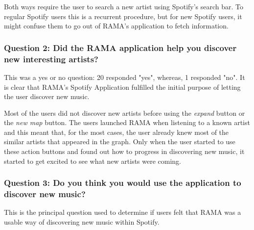       Both ways require the user to search a new artist using Spotify's search bar.
      To regular Spotify users this is a recurrent procedure, but for new Spotify users, it might confuse them to go out of RAMA's application to fetch information.
    
    \subsubsection{Question 2: Did the RAMA application help you discover new interesting artists?}
    \label{ssub:question_2}

      This was a yes or no question: 20 responded "yes", whereas, 1 responded "no".
      It is clear that RAMA's Spotify Application fulfilled the initial purpose of letting the user discover new music.

      Most of the users did not discover new artists before using the \emph{expand} button or the \emph{new map} button.
      The users launched RAMA when listening to a known artist and this meant that, for the most cases, the user already knew most of the similar artists that appeared in the graph.
      Only when the user started to use these action buttons and found out how to progress in discovering new music, it started to get excited to see what new artists were coming.


    \subsubsection{Question 3: Do you think you would use the application to discover new music?}
    \label{ssub:question_3}

      This is the principal question used to determine if users felt that RAMA was a usable way of discovering new music within Spotify.

